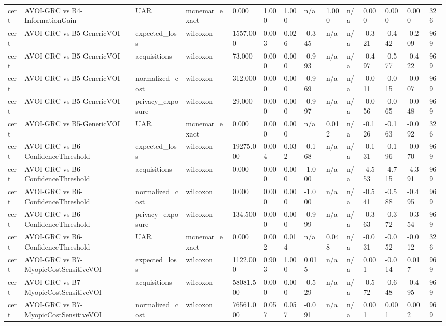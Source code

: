 \begin{table}[!ht]
{\begin{tabular}{llllllllllllll}
cert & AVOI-GRC vs B4-InformationGain & UAR & mcnemar\_exact & 0.000 & 1.000 & 1.000 & n/a & 1.000 & n/a & 0.000 & 0.000 & 0.000 & 326 \\
cert & AVOI-GRC vs B5-GenericVOI & expected\_loss & wilcoxon & 1557.000 & 0.003 & 0.026 & -0.345 & n/a & n/a & -0.321 & -0.442 & -0.209 & 969 \\
cert & AVOI-GRC vs B5-GenericVOI & acquisitions & wilcoxon & 73.000 & 0.000 & 0.000 & -0.993 & n/a & n/a & -0.497 & -0.577 & -0.422 & 969 \\
cert & AVOI-GRC vs B5-GenericVOI & normalized\_cost & wilcoxon & 312.000 & 0.000 & 0.000 & -0.969 & n/a & n/a & -0.011 & -0.015 & -0.007 & 969 \\
cert & AVOI-GRC vs B5-GenericVOI & privacy\_exposure & wilcoxon & 29.000 & 0.000 & 0.000 & -0.997 & n/a & n/a & -0.056 & -0.065 & -0.048 & 969 \\
cert & AVOI-GRC vs B5-GenericVOI & UAR & mcnemar\_exact & 0.000 & 0.000 & 0.000 & n/a & 0.012 & n/a & -0.126 & -0.163 & -0.092 & 326 \\
cert & AVOI-GRC vs B6-ConfidenceThreshold & expected\_loss & wilcoxon & 19275.000 & 0.004 & 0.032 & -0.168 & n/a & n/a & -0.131 & -0.196 & -0.070 & 969 \\
cert & AVOI-GRC vs B6-ConfidenceThreshold & acquisitions & wilcoxon & 0.000 & 0.000 & 0.000 & -1.000 & n/a & n/a & -4.553 & -4.715 & -4.391 & 969 \\
cert & AVOI-GRC vs B6-ConfidenceThreshold & normalized\_cost & wilcoxon & 0.000 & 0.000 & 0.000 & -1.000 & n/a & n/a & -0.541 & -0.588 & -0.495 & 969 \\
cert & AVOI-GRC vs B6-ConfidenceThreshold & privacy\_exposure & wilcoxon & 134.500 & 0.000 & 0.000 & -0.999 & n/a & n/a & -0.363 & -0.372 & -0.354 & 969 \\
cert & AVOI-GRC vs B6-ConfidenceThreshold & UAR & mcnemar\_exact & 0.000 & 0.002 & 0.014 & n/a & 0.048 & n/a & -0.031 & -0.052 & -0.012 & 326 \\
cert & AVOI-GRC vs B7-MyopicCostSensitiveVOI & expected\_loss & wilcoxon & 1122.000 & 0.903 & 1.000 & 0.015 & n/a & n/a & 0.001 & -0.014 & 0.017 & 969 \\
cert & AVOI-GRC vs B7-MyopicCostSensitiveVOI & acquisitions & wilcoxon & 58081.500 & 0.000 & 0.000 & -0.529 & n/a & n/a & -0.572 & -0.648 & -0.495 & 969 \\
cert & AVOI-GRC vs B7-MyopicCostSensitiveVOI & normalized\_cost & wilcoxon & 76561.000 & 0.057 & 0.057 & -0.091 & n/a & n/a & 0.001 & 0.001 & 0.002 & 969 \\

\end{tabular}}
\end{table}
